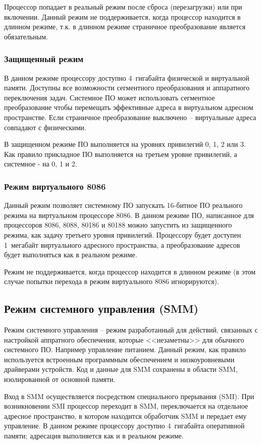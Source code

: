 Процессор попадает в реальный режим после сброса (перезагрузки) или при включении. Данный режим не поддерживается,
когда процессор находится в длинном режиме, т.к. в длинном режиме страничное преобразование является обязательным.

\subsubsection*{Защищенный режим}
В данном режиме процессору доступно 4~гигабайта физической и виртуальной памяти. Доступны все возможности
сегментного преобразования и аппаратного переключения задач. Системное ПО может использовать сегментное преобразование
чтобы перемещать эффективные адреса в виртуальном адресном пространстве. Если страничное преобразование выключено --
виртуальные адреса совпадают с физическими.

В защищенном режиме ПО выполняется на уровнях привилегий 0, 1, 2 или 3. Как правило прикладное ПО выполняется на третьем
уровне привилегий, а системное - на 0, 1 и 2.

\subsubsection*{Режим виртуального 8086}
Данный режим позволяет системному ПО запускать 16-битное ПО реального режима на виртуальном процессоре 8086.
В данном режиме ПО, написанное для процессоров 8086, 8088, 80186 и 80188 можно запустить из защищенного режима,
как задачу третьего уровня привилегий. Процессору будет доступен 1~мегабайт виртуального адресного пространства, а
преобразование адресов будет выполняться как в реальном режиме.

Режим не поддерживается, когда процессор находится в длинном режиме (в этом случае попытки перехода в режим
виртуального 8086 игнорируются).

\subsection{Режим системного управления (SMM)}
Режим системного управления -- режим разработанный для действий, связанных с настройкой аппратного обеспечения,
которые <<незаметны>> для обычного системного ПО. Например управление питанием. Данный режим, как правило используется
встроенным программным обеспечением и низкоуровневыми драйверами устройств. Код и данные для SMM сохранены в
области SMM, изолированной от основной памяти.

Вход в SMM осуществляется посредством специального прерывания (SMI). При возникновении SMI процессор переходит
в SMM, переключается на отдельное адресное пространство, в котором находится обработчик SMM и передает ему управление.
В данном режиме процессору доступно 4~гигабайта оперативной памяти; адресация выполняется как и в реальном режиме.

